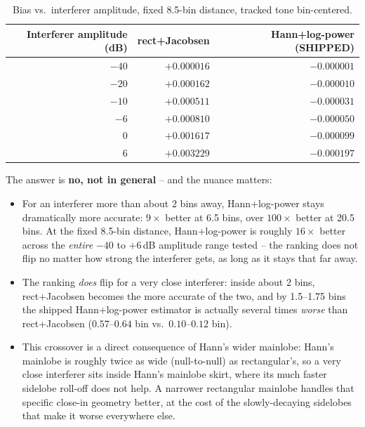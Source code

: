 \documentclass[11pt]{article}
\begin{document}
\begin{table}[H]
  \centering
  \caption{Bias vs.\ interferer amplitude, fixed 8.5-bin distance,
  tracked tone bin-centered.}
  \label{tab:interferer-amplitude}
  \begin{tabular}{rrr}
    \toprule
    Interferer amplitude (dB) & rect+Jacobsen & Hann+log-power (SHIPPED) \\
    \midrule
    $-40$ & $+0.000016$ & $-0.000001$ \\
    $-20$ & $+0.000162$ & $-0.000010$ \\
    $-10$ & $+0.000511$ & $-0.000031$ \\
    $-6$  & $+0.000810$ & $-0.000050$ \\
    $0$   & $+0.001617$ & $-0.000099$ \\
    $6$   & $+0.003229$ & $-0.000197$ \\
    \bottomrule
  \end{tabular}
\end{table}

The answer is \textbf{no, not in general} -- and the nuance matters:
\begin{itemize}
  \item For an interferer more than about $2$ bins away, Hann+log-power
        stays dramatically more accurate: $9\times$ better at 6.5 bins,
        over $100\times$ better at 20.5 bins. At the fixed 8.5-bin
        distance, Hann+log-power is roughly $16\times$ better across
        the \emph{entire} $-40$ to $+6\,$dB amplitude range tested --
        the ranking does not flip no matter how strong the interferer
        gets, as long as it stays that far away.
  \item The ranking \emph{does} flip for a very close interferer:
        inside about $2$ bins, rect+Jacobsen becomes the more accurate
        of the two, and by 1.5--1.75 bins the shipped Hann+log-power
        estimator is actually several times \emph{worse} than
        rect+Jacobsen ($0.57$--$0.64$ bin vs.\ $0.10$--$0.12$ bin).
  \item This crossover is a direct consequence of Hann's wider
        mainlobe: Hann's mainlobe is roughly twice as wide
        (null-to-null) as rectangular's, so a very close interferer
        sits inside Hann's mainlobe skirt, where its much faster
        sidelobe roll-off does not help. A narrower rectangular
        mainlobe handles that specific close-in geometry better, at
        the cost of the slowly-decaying sidelobes that make it worse
        everywhere else.
\end{itemize}
\end{document}
